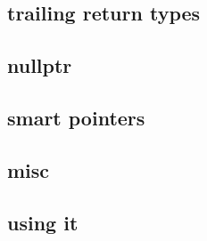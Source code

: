 \subsection{trailing return types}

\subsection{nullptr}

\subsection{smart pointers}

\subsection{misc}

\subsection{using it}

